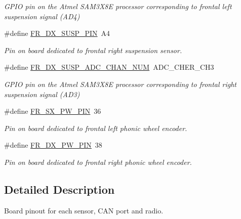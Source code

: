 \begin{DoxyCompactItemize}
\begin{DoxyCompactList}\small\item\em G\+P\+IO pin on the Atmel S\+A\+M3\+X8E processor corresponding to frontal left suspension signal (A\+D4) \end{DoxyCompactList}\item 
\mbox{\label{group___board__pinout__group_gac6b52ca09115f1f82aa92ffd31363c05}} 
\#define \mbox{\hyperlink{group___board__pinout__group_gac6b52ca09115f1f82aa92ffd31363c05}{F\+R\+\_\+\+D\+X\+\_\+\+S\+U\+S\+P\+\_\+\+P\+IN}}~A4
\begin{DoxyCompactList}\small\item\em Pin on board dedicated to frontal right suspension sensor. \end{DoxyCompactList}\item 
\mbox{\label{group___board__pinout__group_ga0e9f0303c372af214367d86ad38f660d}} 
\#define \mbox{\hyperlink{group___board__pinout__group_ga0e9f0303c372af214367d86ad38f660d}{F\+R\+\_\+\+D\+X\+\_\+\+S\+U\+S\+P\+\_\+\+A\+D\+C\+\_\+\+C\+H\+A\+N\+\_\+\+N\+UM}}~A\+D\+C\+\_\+\+C\+H\+E\+R\+\_\+\+C\+H3
\begin{DoxyCompactList}\small\item\em G\+P\+IO pin on the Atmel S\+A\+M3\+X8E processor corresponding to frontal right suspension signal (A\+D3) \end{DoxyCompactList}\item 
\mbox{\label{group___board__pinout__group_ga283872484ffa2d7043a08a80ff7a6cbc}} 
\#define \mbox{\hyperlink{group___board__pinout__group_ga283872484ffa2d7043a08a80ff7a6cbc}{F\+R\+\_\+\+S\+X\+\_\+\+P\+W\+\_\+\+P\+IN}}~36
\begin{DoxyCompactList}\small\item\em Pin on board dedicated to frontal left phonic wheel encoder. \end{DoxyCompactList}\item 
\mbox{\label{group___board__pinout__group_gad70d75cffb6389aff09c9d9b67a70777}} 
\#define \mbox{\hyperlink{group___board__pinout__group_gad70d75cffb6389aff09c9d9b67a70777}{F\+R\+\_\+\+D\+X\+\_\+\+P\+W\+\_\+\+P\+IN}}~38
\begin{DoxyCompactList}\small\item\em Pin on board dedicated to frontal right phonic wheel encoder. \end{DoxyCompactList}\end{DoxyCompactItemize}


\subsection{Detailed Description}
Board pinout for each sensor, C\+AN port and radio. 